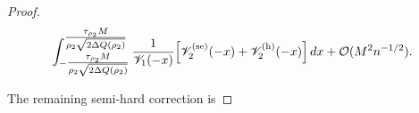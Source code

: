 \documentclass[a4paper]{article}
\newcommand{\erfc}{{\rm erfc}}
\numberwithin{equation}{section}
\begin{document}
\begin{proof}
\begin{align*}
\int_{-\tfrac{\tau_{\rho_2}M}{\rho_2\sqrt{2\Delta Q(\rho_2)}}}^{\tfrac{\tau_{\rho_2}M}{\rho_2\sqrt{2\Delta Q(\rho_2)}}}
\frac{1}{\mathscr{V}_1(-x)}\Bigl[
\mathscr{V}_2^{(\mathrm{se})}(-x)+\mathscr{V}_2^{(\mathrm{h})}(-x)
\Bigr]\,dx
+\mathcal{O}(M^2n^{-1/2}).
\end{align*}

The remaining semi-hard correction is

\end{proof}
\end{document}
